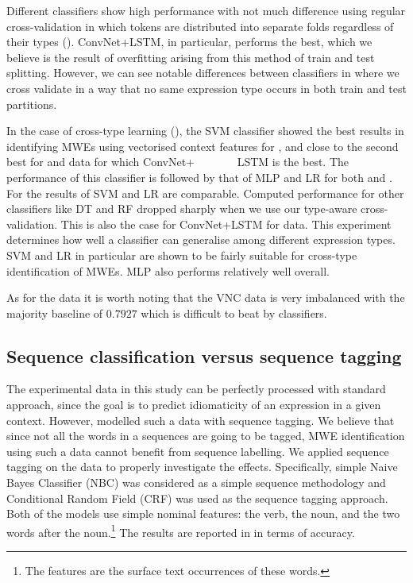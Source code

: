 \documentclass[output=paper
,modfonts
,nonflat]{langsci/langscibook}
\begin{document}
Different classifiers show high performance with not much difference using regular cross-validation in which tokens are distributed into separate folds regardless of their types (). ConvNet+LSTM, in particular, performs the best, %
which we believe is the result of overfitting arising from this method of train and test splitting. 
However, we can see notable differences between classifiers in  where we cross validate in a way that no same expression type occurs in both train and test partitions. %

In the case of cross-type learning (), the SVM classifier showed the best results in identifying MWEs using vectorised context features for , and close to the second best for  and  data for which ConvNet+ ~~~~~~~LSTM is the best. The performance of this classifier is followed by that of MLP and LR for both  and . For  the results of SVM and LR are comparable. Computed performance for other classifiers like DT and RF dropped sharply when we use our type-aware cross-validation.
This is also the case for ConvNet+LSTM for  data.
This experiment determines how well a classifier can generalise among different expression types. SVM and LR in particular are shown to be fairly suitable for cross-type identification of MWEs. MLP also performs relatively well overall. 

As for the  data it is worth noting that the VNC data is very imbalanced with the majority baseline of $0.7927$ which is difficult to beat by classifiers. 



\subsection{Sequence classification versus sequence tagging}
\label{sec:res2}
The experimental data in this study can be perfectly processed with standard  approach, since the goal is to predict idiomaticity of an expression in a given context. However, \cite{scholivet-ramisch:2017:MWE2017} modelled such a data with sequence tagging. We believe that since not all the words in a sequences are going to be tagged, MWE identification using such a data cannot benefit from sequence labelling. 
We applied sequence tagging on the data to properly investigate the effects. Specifically, simple Naive Bayes Classifier (NBC) was considered as a simple sequence  methodology and Conditional Random Field (CRF) was used as the sequence tagging approach. Both of the models use simple nominal features: the verb, the noun, and the two words after the noun.\footnote{The features are the surface text occurrences of these words.} The results are reported in  in terms of accuracy.
\end{document}

